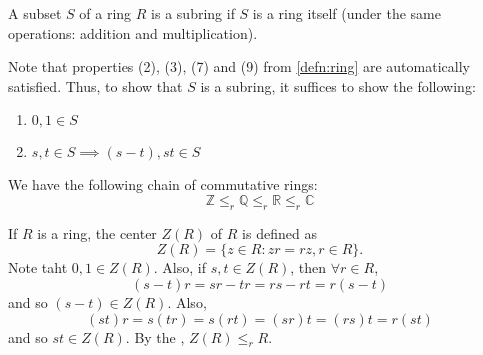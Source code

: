 \begin{defn}[Subring]
\label{defn:subring}
A subset $S$ of a ring $R$ is a subring if $S$ is a ring itself (under the same operations: addition and multiplication).
\end{defn}

Note that properties (2), (3), (7) and (9) from \cref{defn:ring} are automatically satisfied. Thus, to show that $S$ is a subring, it suffices to show the following:

\label{spe:subring_test}
\begin{enumerate}
  \item $0, 1 \in S$ 
  \item $s, t \in S \implies ( s - t ), st \in S$
\end{enumerate}

\begin{eg}
  We have the following chain of commutative rings:
  \begin{equation*}
    \mathbb{Z} \leq_r \mathbb{Q} \leq_r \mathbb{R} \leq_r \mathbb{C}
  \end{equation*}
\end{eg}

\begin{eg}
  If $R$ is a ring, the \textcolor{base16-eighties-blue}{center} $Z(R)$ of $R$ is defined as
  \begin{equation*}
    Z(R) = \{ z \in R : zr = rz, r \in R \}.
  \end{equation*}
  Note taht $0, 1 \in Z(R)$. Also, if $s, t \in Z(R)$, then $\forall r \in R$,
  \begin{equation*}
    (s - t) r = sr - tr = rs - rt = r( s - t )
  \end{equation*}
  and so $(s - t) \in Z(R)$. Also,
  \begin{equation*}
    (st)r = s(tr) = s(rt) = (sr)t = (rs)t = r(st)
  \end{equation*}
  and so $st \in Z(R)$. By the , $Z(R) \leq_r R$.
\end{eg}

